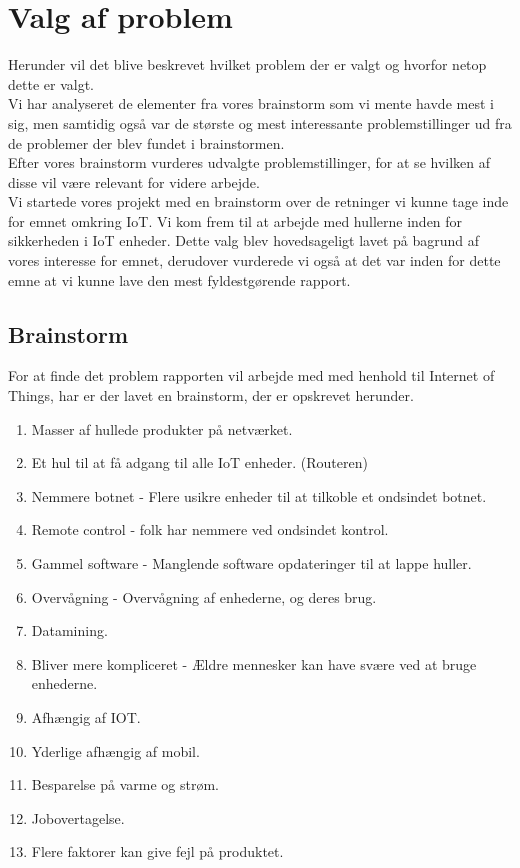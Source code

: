 \section{Valg af problem}
Herunder vil det blive beskrevet hvilket problem der er valgt og hvorfor netop dette er valgt.\\
Vi har analyseret de elementer fra vores brainstorm som vi mente havde mest i sig, men samtidig også var de største og mest interessante problemstillinger ud fra de problemer der blev fundet i brainstormen.\\
Efter vores brainstorm vurderes udvalgte problemstillinger, for at se hvilken af disse vil være relevant for videre arbejde.\\
Vi startede vores projekt med en brainstorm over de retninger vi kunne tage inde for emnet omkring IoT. Vi kom frem til at arbejde med hullerne inden for sikkerheden i IoT enheder. Dette valg blev hovedsageligt lavet på bagrund af vores interesse for emnet, derudover vurderede vi også at det var inden for dette emne at vi kunne lave den mest fyldestgørende rapport. 



    \subsection{Brainstorm}
    For at finde det problem rapporten vil arbejde med med henhold til Internet of Things, har er der lavet en brainstorm, der er opskrevet herunder.
        
        \begin{enumerate}
            \item Masser af hullede produkter på netværket.
            \item Et hul til at få adgang til alle IoT enheder. (Routeren)
            \item Nemmere botnet - Flere usikre enheder til at tilkoble et ondsindet botnet.
            \item Remote control - folk har nemmere ved ondsindet kontrol.
            \item Gammel software - Manglende software opdateringer til at lappe huller.
            \item Overvågning - Overvågning af enhederne, og deres brug.
            \item Datamining.
            \item Bliver mere kompliceret - Ældre mennesker kan have svære ved at bruge enhederne.
            \item Afhængig af IOT.
            \item Yderlige afhængig af mobil.
            \item Besparelse på varme og strøm.
            \item Jobovertagelse. 
            \item Flere faktorer kan give fejl på produktet.
        \end{enumerate}
\newpage


